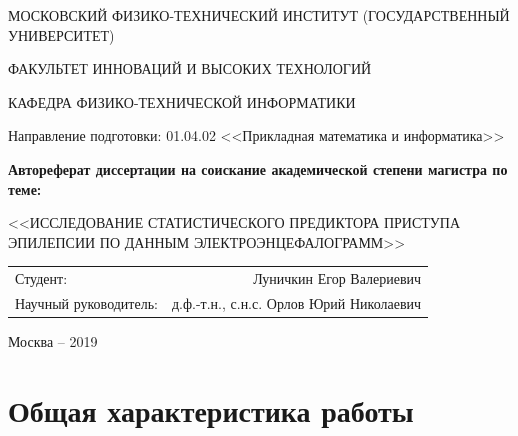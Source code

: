 \documentclass[a4paper,12pt]{report}
\begin{document}

\thispagestyle{empty}

\begin{center}
\MakeUppercase{Московский физико-технический институт (государственный университет)} \par
\MakeUppercase{Факультет инноваций и высоких технологий} \par
\MakeUppercase{Кафедра физико-технической информатики} \par
Направление подготовки: 01.04.02 <<Прикладная математика и информатика>>
\end{center}

\vspace{40mm}

\begin{center}
{\bf \large Автореферат диссертации на соискание академической степени магистра по теме:\par\MakeUppercase{<<Исследование статистического предиктора приступа эпилепсии по данным электроэнцефалограмм>>}
\par}
\end{center}

\vspace{70mm}

\begin{tabular}{lr}
{\large Студент:}     &  {\large Луничкин Егор Валериевич} \\
{\large Научный руководитель:}     &  {\large д.ф.-т.н., с.н.с. Орлов Юрий Николаевич} 
\end{tabular}

\vspace{20mm}


\begin{center}
{Москва -- 2019}
\end{center}

\tableofcontents
\clearpage


\chapter{Общая характеристика работы}
\end{document}
